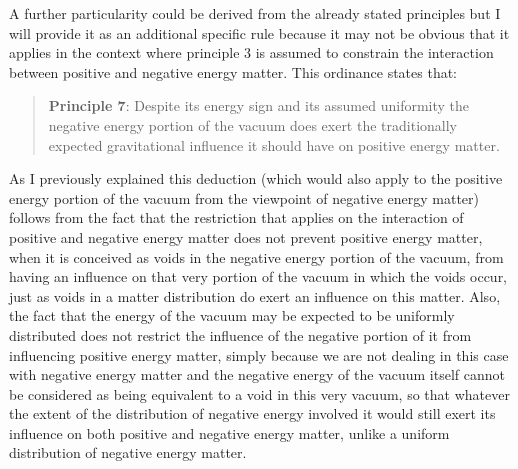 \documentclass[notitlepage,12pt]{report}
\begin{document}
A further particularity could be derived from the already stated principles but I will provide it as an additional specific rule because it may not be obvious that it applies in the context where principle 3 is assumed to constrain the interaction between positive and negative energy matter. This ordinance states that:
\begin{quote}
\textbf{Principle 7}: Despite its energy sign and its assumed uniformity the negative energy portion of the vacuum does exert the traditionally expected gravitational influence it should have on positive energy matter.
\end{quote}
As I previously explained this deduction (which would also apply to the positive energy portion of the vacuum from the viewpoint of negative energy matter) follows from the fact that the restriction that applies on the interaction of positive and negative energy matter does not prevent positive energy matter, when it is conceived as voids in the negative energy portion of the vacuum, from having an influence on that very portion of the vacuum in which the voids occur, just as voids in a matter distribution do exert an influence on this matter. Also, the fact that the energy of the vacuum may be expected to be uniformly distributed does not restrict the influence of the negative portion of it from influencing positive energy matter, simply because we are not dealing in this case with negative energy matter and the negative energy of the vacuum itself cannot be considered as being equivalent to a void in this very vacuum, so that whatever the extent of the distribution of negative energy involved it would still exert its influence on both positive and negative energy matter, unlike a uniform distribution of negative energy matter.
\end{document}

